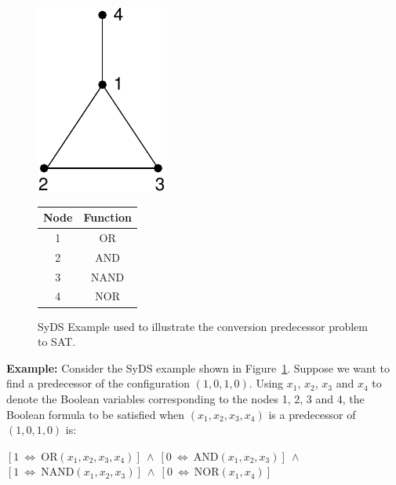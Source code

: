 \begin{figure}[tbh]
\begin{minipage}{0.5\textwidth}
\centering
\includegraphics[scale=0.75]{./graph_example.pdf}
\end{minipage}
\hspace*{0.25in}
\begin{minipage}{0.4\textwidth}
\smallskip
\noindent
\begin{tabular}{|c|c|}\hline
\textbf{Node} & \textbf{Function} \\ \hline
1  &  OR \\ \hline
2  &  AND \\ \hline
3  &  NAND \\ \hline
4  &  NOR \\ \hline
\end{tabular}
\end{minipage}
\caption{\small{SyDS Example used to illustrate
the conversion predecessor problem to SAT.}}
\label{fig:syds_ex}
\end{figure}

\noindent
\textbf{Example:} Consider the SyDS example shown in Figure~\ref{fig:syds_ex}.
Suppose we want to find a predecessor of the configuration $(1, 0, 1, 0)$.
Using $x_1$, $x_2$, $x_3$ and $x_4$ to denote the Boolean variables corresponding
to the nodes 1, 2, 3 and 4, the Boolean formula to be satisfied when 
$(x_1, x_2, x_3, x_4)$ is a predecessor of $(1, 0, 1, 0)$ is:  

\medskip

\noindent
\hspace*{0.5in} $[1 ~\Leftrightarrow~ \mathrm{OR}(x_1, x_2, x_3, x_4)] ~\wedge~
[0 ~\Leftrightarrow~ \mathrm{AND}(x_1, x_2, x_3)] ~\wedge~ $\\
\hspace*{0.5in}
$[1 ~\Leftrightarrow~ \mathrm{NAND}(x_1, x_2, x_3)] ~\wedge~
[0 ~\Leftrightarrow~ \mathrm{NOR}(x_1, x_4)]$


